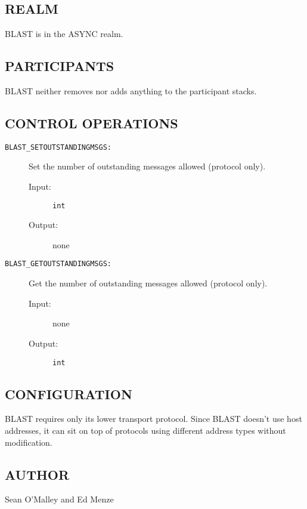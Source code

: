 \subsection*{REALM}

BLAST is in the ASYNC realm.

\subsection*{PARTICIPANTS}

BLAST neither removes nor adds anything to the participant stacks.

\subsection*{CONTROL OPERATIONS}

\begin{description}

\item[{\tt BLAST\_SETOUTSTANDINGMSGS:}]
Set the number of outstanding messages allowed (protocol only).
\begin{description}
\item[{\rm Input:}] {\tt int} 
\item[{\rm Output:}] none
\end{description}

\item[{\tt BLAST\_GETOUTSTANDINGMSGS:}]
Get the number of outstanding messages allowed (protocol only).
\begin{description}
\item[{\rm Input:}]  none
\item[{\rm Output:}] {\tt int} 
\end{description}

\end{description}

\subsection*{CONFIGURATION}

BLAST requires only its lower transport protocol.  Since BLAST doesn't
use host addresses, it can sit on top of protocols using different
address types without modification.

\subsection*{AUTHOR}

\noindent Sean O'Malley and Ed Menze
